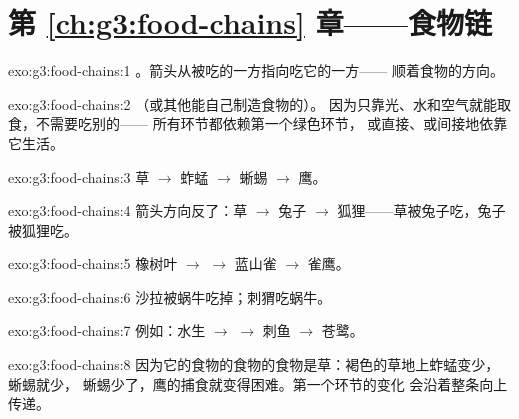 \section*{第 \ref{ch:g3:food-chains} 章——食物链}

\begin{solution}{exo:g3:food-chains:1}
。箭头从被吃的一方指向吃它的一方——
顺着食物的方向。
\end{solution}

\begin{solution}{exo:g3:food-chains:2}
（或其他能自己制造食物的）。
因为只靠光、水和空气就能取食，不需要吃别的——
所有环节都依赖第一个绿色环节，
或直接、或间接地依靠它生活。
\end{solution}

\begin{solution}{exo:g3:food-chains:3}
草 $\rightarrow$ 蚱蜢 $\rightarrow$ 蜥蜴
$\rightarrow$ 鹰。
\end{solution}

\begin{solution}{exo:g3:food-chains:4}
箭头方向反了：草 $\rightarrow$ 兔子
$\rightarrow$ 狐狸——草被兔子吃，兔子
被狐狸吃。
\end{solution}

\begin{solution}{exo:g3:food-chains:5}
橡树叶 $\rightarrow$  $\rightarrow$ 蓝山雀
$\rightarrow$ 雀鹰。
\end{solution}

\begin{solution}{exo:g3:food-chains:6}
沙拉被蜗牛吃掉；刺猬吃蜗牛。
\end{solution}

\begin{solution}{exo:g3:food-chains:7}
例如：水生 $\rightarrow$  $\rightarrow$
刺鱼 $\rightarrow$ 苍鹭。
\end{solution}

\begin{solution}{exo:g3:food-chains:8}
因为它的食物的食物的食物是草：褐色的草地上蚱蜢变少，
蜥蜴就少，
蜥蜴少了，鹰的捕食就变得困难。第一个环节的变化
会沿着整条向上传递。
\end{solution}

